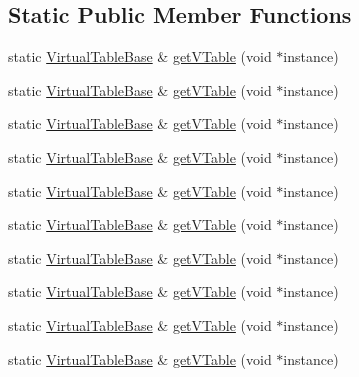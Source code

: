 \subsection*{Static Public Member Functions}
\begin{DoxyCompactItemize}
\item 
static \mbox{\hyperlink{structfakeit_1_1VirtualTableBase}{Virtual\+Table\+Base}} \& \mbox{\hyperlink{structfakeit_1_1VirtualTableBase_aeeac5c6ec4de4c0f316f8d1ee31cf352}{get\+V\+Table}} (void $\ast$instance)
\item 
static \mbox{\hyperlink{structfakeit_1_1VirtualTableBase}{Virtual\+Table\+Base}} \& \mbox{\hyperlink{structfakeit_1_1VirtualTableBase_aeeac5c6ec4de4c0f316f8d1ee31cf352}{get\+V\+Table}} (void $\ast$instance)
\item 
static \mbox{\hyperlink{structfakeit_1_1VirtualTableBase}{Virtual\+Table\+Base}} \& \mbox{\hyperlink{structfakeit_1_1VirtualTableBase_aeeac5c6ec4de4c0f316f8d1ee31cf352}{get\+V\+Table}} (void $\ast$instance)
\item 
static \mbox{\hyperlink{structfakeit_1_1VirtualTableBase}{Virtual\+Table\+Base}} \& \mbox{\hyperlink{structfakeit_1_1VirtualTableBase_aeeac5c6ec4de4c0f316f8d1ee31cf352}{get\+V\+Table}} (void $\ast$instance)
\item 
static \mbox{\hyperlink{structfakeit_1_1VirtualTableBase}{Virtual\+Table\+Base}} \& \mbox{\hyperlink{structfakeit_1_1VirtualTableBase_aeeac5c6ec4de4c0f316f8d1ee31cf352}{get\+V\+Table}} (void $\ast$instance)
\item 
static \mbox{\hyperlink{structfakeit_1_1VirtualTableBase}{Virtual\+Table\+Base}} \& \mbox{\hyperlink{structfakeit_1_1VirtualTableBase_aeeac5c6ec4de4c0f316f8d1ee31cf352}{get\+V\+Table}} (void $\ast$instance)
\item 
static \mbox{\hyperlink{structfakeit_1_1VirtualTableBase}{Virtual\+Table\+Base}} \& \mbox{\hyperlink{structfakeit_1_1VirtualTableBase_aeeac5c6ec4de4c0f316f8d1ee31cf352}{get\+V\+Table}} (void $\ast$instance)
\item 
static \mbox{\hyperlink{structfakeit_1_1VirtualTableBase}{Virtual\+Table\+Base}} \& \mbox{\hyperlink{structfakeit_1_1VirtualTableBase_aeeac5c6ec4de4c0f316f8d1ee31cf352}{get\+V\+Table}} (void $\ast$instance)
\item 
static \mbox{\hyperlink{structfakeit_1_1VirtualTableBase}{Virtual\+Table\+Base}} \& \mbox{\hyperlink{structfakeit_1_1VirtualTableBase_aeeac5c6ec4de4c0f316f8d1ee31cf352}{get\+V\+Table}} (void $\ast$instance)
\item 
static \mbox{\hyperlink{structfakeit_1_1VirtualTableBase}{Virtual\+Table\+Base}} \& \mbox{\hyperlink{structfakeit_1_1VirtualTableBase_aeeac5c6ec4de4c0f316f8d1ee31cf352}{get\+V\+Table}} (void $\ast$instance)
\end{DoxyCompactItemize}
